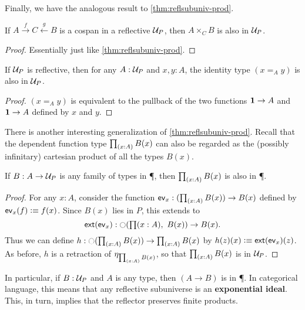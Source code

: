 Finally, we have the analogous result to \autoref{thm:reflsubuniv-prod}.

\begin{thm}\label{thm:reflsubuniv-pb}
  If $A \xrightarrow{f}  C \xleftarrow{g} B$ is a cospan in a reflective $\P$, then $A\times_C B$ is also in $\P$.
\end{thm}
\begin{proof}
  Essentially just like \autoref{thm:reflsubuniv-prod}.
\end{proof}

\begin{cor}\label{thm:reflsubuniv-idtype}
  If $\P$ is reflective, then for any $A:\P$ and $x,y:A$, the identity type $(x=_A y)$ is also in $\P$.
\end{cor}
\begin{proof}
  $(x=_A y)$ is equivalent to the pullback of the two functions $\unit \to A$ and $\unit\to A$ defined by $x$ and $y$.
\end{proof}

There is another interesting generalization of \autoref{thm:reflsubuniv-prod}.
Recall that the dependent function type $\prd{x:A} B(x)$ can also be regarded as the (possibly infinitary) cartesian product of all the
types $B(x)$.

\begin{thm}\label{thm:reflsubunv-forall}
  If $B:A\to\P$ is any family of types in \P, then $\prd{x:A} B(x)$ is also in \P.
\end{thm}
\begin{proof}
  For any $x:A$, consider the function $\mathsf{ev}_x : (\prd{x:A} B(x)) \to B(x)$ defined by $\mathsf{ev}_x(f) \defeq f(x)$.
  Since $B(x)$ lies in $P$, this extends to
  \[ \ext(\mathsf{ev}_x) : \reflect(\prd{x:A} B(x)) \to B(x). \]
  Thus we can define $h:\reflect(\prd{x:A} B(x)) \to \prd{x:A} B(x)$ by $h(z)(x) \defeq \ext(\mathsf{ev}_x)(z)$.
  As before, $h$ is a retraction of $\project_{\prd{x:A} B(x)}$, so that ${\prd{x:A} B(x)}$ is in $\P$.
\end{proof}

In particular, if $B:\P$ and $A$ is any type, then $(A\to B)$ is in \P.
In categorical language, this means that any reflective subuniverse is an \textbf{exponential ideal}.
This, in turn, implies that the reflector preserves finite products.

